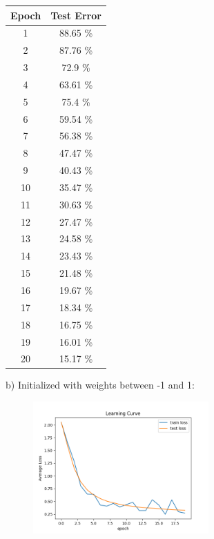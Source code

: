 \documentclass[a4paper]{article}
\theoremstyle{definition}
\newenvironment{soln}{
    \leavevmode\color{blue}\ignorespaces
}{}
\begin{document}
\begin{enumerate}
\begin{soln}
        \begin{center}
            \begin{tabular}{c | c}
                Epoch & Test Error \\ \hline
                1 & 88.65 \% \\
                2 & 87.76 \% \\
                3 & 72.9 \% \\
                4 & 63.61 \% \\
                5 & 75.4 \% \\
                6 & 59.54 \% \\
                7 & 56.38 \% \\
                8 & 47.47 \% \\
                9 & 40.43 \% \\
                10 & 35.47 \% \\
                11 & 30.63 \% \\
                12 & 27.47 \% \\
                13 & 24.58 \% \\
                14 & 23.43 \% \\
                15 & 21.48 \% \\
                16 & 19.67 \% \\
                17 & 18.34 \% \\
                18 & 16.75 \% \\
                19 & 16.01 \% \\
                20 & 15.17 \% \\
            \end{tabular}
        \end{center}

        b) Initialized with weights between -1 and 1:
        
        \begin{figure}[H]
			\centering
			\includegraphics[width=0.6\textwidth]{../figs/neg_one_one_learning_curve.png}
		\end{figure}
       

\end{soln}
\end{enumerate}
\end{document}
